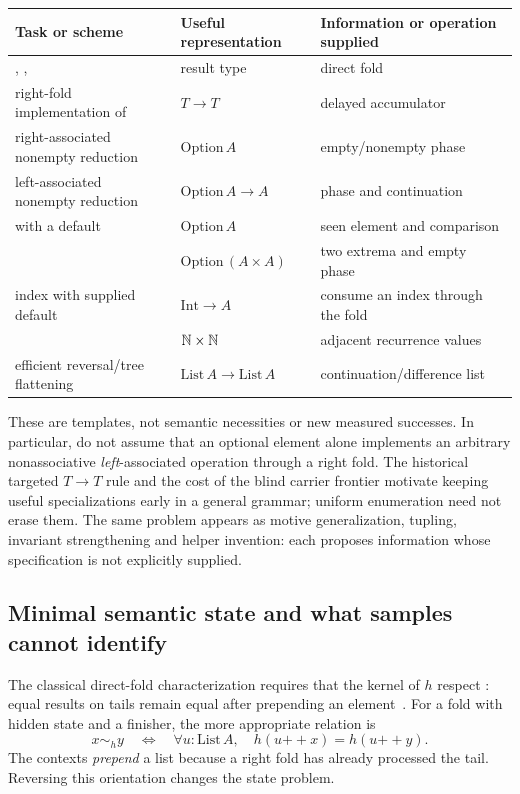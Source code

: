 \begin{center}\small
\begin{tabular}{@{}L{35mm}L{51mm}L{60mm}@{}}
\toprule
Task or scheme & Useful representation & Information or operation supplied\\
\midrule
{}, ,  & result type & direct fold\\
right-fold implementation of  & $T\to T$ & delayed accumulator\\
right-associated nonempty reduction & $\mathrm{Option}\,A$ & empty/nonempty phase\\
left-associated nonempty reduction & $\mathrm{Option}\,A\to A$ & phase and continuation\\
 with a default & $\mathrm{Option}\,A$ & seen element and comparison\\
 & $\mathrm{Option}\,(A\times A)$ & two extrema and empty phase\\
index with supplied default & $\mathrm{Int}\to A$ & consume an index through the fold\\
 & $\mathbb{N}\times\mathbb{N}$ & adjacent recurrence values\\
efficient reversal/tree flattening & $\mathrm{List}\,A\to\mathrm{List}\,A$ & continuation/difference list\\
\bottomrule
\end{tabular}
\end{center}

These are templates, not semantic necessities or new measured successes.
In particular, do not assume that an optional element alone implements an
arbitrary nonassociative \emph{left}-associated operation through a right fold.
The historical targeted $T\to T$ rule and the cost of the blind carrier
frontier motivate keeping useful specializations early in a general grammar;
uniform enumeration need not erase them. The same problem appears as motive
generalization, tupling, invariant strengthening and helper invention: each
proposes information whose specification is not explicitly supplied.

\subsection{Minimal semantic state and what samples cannot identify}
\label{sec:carrier-quotient}

The classical direct-fold characterization requires that the kernel of $h$
respect : equal results on tails remain equal after prepending an
element~\cite{whenfold}. For a fold with hidden state and a finisher, the more
appropriate relation is
\begin{equation}\label{eq:carrier-residual}
 x\sim_h y\quad\Longleftrightarrow\quad
 \forall u:\mathrm{List}\,A,\quad
 h(u\mathbin{+\!+}x)=h(u\mathbin{+\!+}y).
\end{equation}
The contexts \emph{prepend} a list because a right fold has already processed
the tail. Reversing this orientation changes the state problem.

